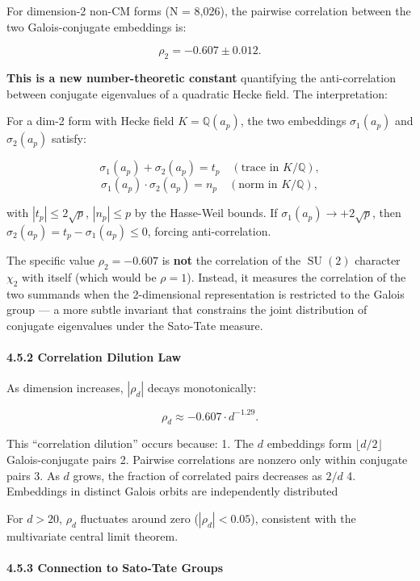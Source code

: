 \documentclass[
]{article}
\begin{document}
For dimension-2 non-CM forms (N = 8,026), the pairwise correlation
between the two Galois-conjugate embeddings is:

\[\rho_2 = -0.607 \pm 0.012.\]

\textbf{This is a new number-theoretic constant} quantifying the
anti-correlation between conjugate eigenvalues of a quadratic Hecke
field. The interpretation:

For a dim-2 form with Hecke field \(K = \mathbb{Q}(a_p)\), the two
embeddings \(\sigma_1(a_p)\) and \(\sigma_2(a_p)\) satisfy:

\[\sigma_1(a_p) + \sigma_2(a_p) = t_p \quad (\text{trace in } K/\mathbb{Q}),\]
\[\sigma_1(a_p) \cdot \sigma_2(a_p) = n_p \quad (\text{norm in } K/\mathbb{Q}),\]

with \(|t_p| \le 2\sqrt{p}\), \(|n_p| \le p\) by the Hasse-Weil bounds.
If \(\sigma_1(a_p) \to +2\sqrt{p}\), then
\(\sigma_2(a_p) = t_p - \sigma_1(a_p) \le 0\), forcing anti-correlation.

The specific value \(\rho_2 = -0.607\) is \textbf{not} the correlation
of the \(\operatorname{SU}(2)\) character \(\chi_2\) with itself (which
would be \(\rho = 1\)). Instead, it measures the correlation of the two
summands when the 2-dimensional representation is restricted to the
Galois group --- a more subtle invariant that constrains the joint
distribution of conjugate eigenvalues under the Sato-Tate measure.

\hypertarget{correlation-dilution-law}{%
\paragraph{4.5.2 Correlation Dilution
Law}\label{correlation-dilution-law}}

As dimension increases, \(|\rho_d|\) decays monotonically:

\[\rho_d \approx -0.607 \cdot d^{-1.29}.\]

This ``correlation dilution'' occurs because: 1. The \(d\) embeddings
form \(\lfloor d/2 \rfloor\) Galois-conjugate pairs 2. Pairwise
correlations are nonzero only within conjugate pairs 3. As \(d\) grows,
the fraction of correlated pairs decreases as \(2/d\) 4. Embeddings in
distinct Galois orbits are independently distributed

For \(d > 20\), \(\rho_d\) fluctuates around zero (\(|\rho_d| < 0.05\)),
consistent with the multivariate central limit theorem.

\hypertarget{connection-to-sato-tate-groups}{%
\paragraph{4.5.3 Connection to Sato-Tate
Groups}\label{connection-to-sato-tate-groups}}
\end{document}
